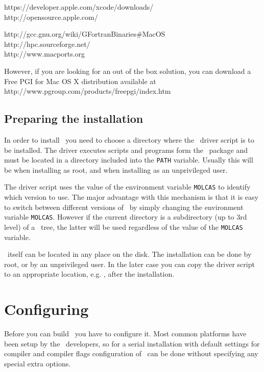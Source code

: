 https://developer.apple.com/xcode/downloads/\\
http://opensource.apple.com/

http://gcc.gnu.org/wiki/GFortranBinaries\#MacOS \\
http://hpc.sourceforge.net/ \\
http://www.macports.org

However, if you are looking for an out of the box solution, you can download a Free PGI for Mac OS X
distribution available at \\ http://www.pgroup.com/products/freepgi/index.htm

\subsection{Preparing the installation}

In order to install \molcas\ you need to choose a directory
where the \molcas\ driver script is to be installed. The driver
executes scripts and programs form the \molcas\ package and must be
located in a directory included into the {\tt PATH} variable.
Usually this will be  when installing as root,
and  when installing as an unprivileged user.

The driver script  uses the value of the environment variable
{\tt MOLCAS} to identify which version to use. The major advantage with this
mechanism is that it is easy to switch between different versions of \molcas\
by simply changing the environment variable {\tt MOLCAS}.
However if the current directory is a subdirectory (up to 3rd level) of a
\molcas\ tree, the latter will be used regardless of the value of the {\tt MOLCAS} variable.

\molcas\ itself can be located in any place on the disk.
The installation can be done by root, or by an unprivileged user.
In the later case you can copy the \file{molcas} driver script to an appropriate
location, e.g. \file{/usr/local/bin}, after the installation.

\section{\label{sec:configure_molcas}Configuring \molcas}

Before you can build \molcas\ you have to configure it.
Most common platforms have been setup by the \molcas\ developers, so for a serial
installation with default settings for compiler and compiler flags configuration
of \molcas\ can be done without specifying any special extra options.

